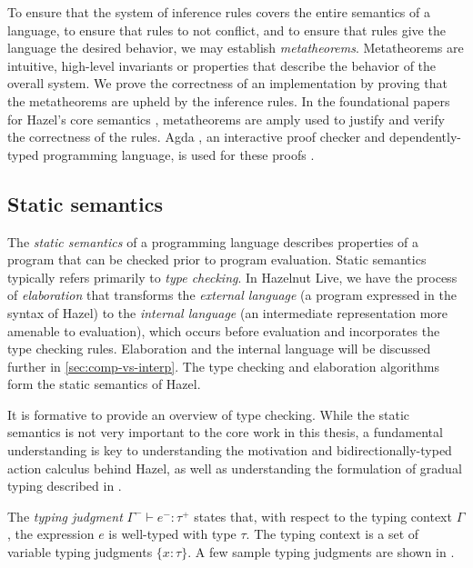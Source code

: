 To ensure that the system of inference rules covers the entire semantics of a language, to ensure that rules to not conflict, and to ensure that rules give the language the desired behavior, we may establish \textit{metatheorems}. Metatheorems are intuitive, high-level invariants or properties that describe the behavior of the overall system. We prove the correctness of an implementation by proving that the metatheorems are upheld by the inference rules. In the foundational papers for Hazel's core semantics \cite{conf/popl/Hazelnut17,conf/popl/HazelnutLive19}, metatheorems are amply used to justify and verify the correctness of the rules. Agda \cite{bove2009brief}, an interactive proof checker and dependently-typed programming language, is used for these proofs \cite{agda2017_git,agda2019_git}.

\subsection{Static semantics}
\label{sec:static-semantics}

The \textit{static semantics} of a programming language describes properties of a program that can be checked prior to program evaluation. Static semantics typically refers primarily to \textit{type checking}. In Hazelnut Live, we have the process of \textit{elaboration} that transforms the \textit{external language} (a program expressed in the syntax of Hazel) to the \textit{internal language} (an intermediate representation more amenable to evaluation), which occurs before evaluation and incorporates the type checking rules. Elaboration and the internal language will be discussed further in \cref{sec:comp-vs-interp}. The type checking and elaboration algorithms form the static semantics of Hazel.

It is formative to provide an overview of type checking. While the static semantics is not very important to the core work in this thesis, a fundamental understanding is key to understanding the motivation and bidirectionally-typed action calculus behind Hazel, as well as understanding the formulation of gradual typing described in .

The \textit{typing judgment} $\Gamma^-\vdash e^-:\tau^+$ states that, with respect to the typing context $\Gamma$, the expression $e$ is well-typed with type $\tau$. The typing context is a set of variable typing judgments $\{x:\tau\}$. A few sample typing judgments are shown in .

